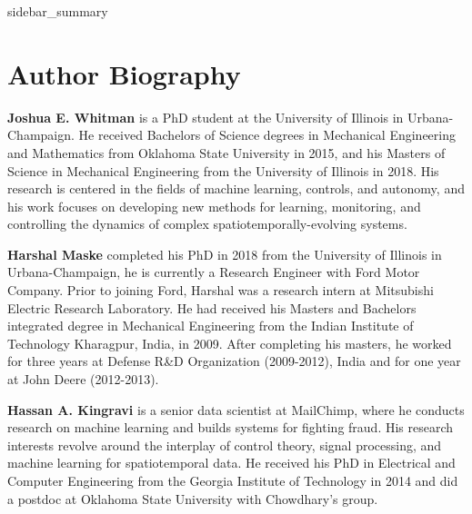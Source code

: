\documentclass[letterpaper,12pt,peerreviewca,draftcls]{IEEEtran}
\begin{document}
\processdelayedfloats
\sidebars


\renewcommand{\thealgorithm}{S\arabic{algorithm}} 
\setcounter{algorithm}{0}

\clearpage
 {sidebar_summary}

\clearpage


\clearpage


\clearpage





\newpage
\section{Author Biography}

\noindent \textbf{Joshua E. Whitman} is a PhD student at the University of Illinois in Urbana-Champaign. He received Bachelors of Science degrees in Mechanical Engineering and Mathematics from Oklahoma State University in 2015, and his Masters of Science in Mechanical Engineering from the University of Illinois in 2018. His research is centered in the fields of machine learning, controls, and autonomy, and his work focuses on developing new methods for learning, monitoring, and controlling the dynamics of complex spatiotemporally-evolving systems.

\noindent \textbf{Harshal Maske} completed his PhD in 2018 from the University of Illinois in Urbana-Champaign, he is currently a Research Engineer with Ford Motor Company. Prior to joining Ford, Harshal was a research intern at Mitsubishi Electric Research Laboratory. He had received his Masters and Bachelors integrated degree in Mechanical Engineering from the Indian Institute of Technology Kharagpur, India, in 2009. After completing his masters, he worked for three years at Defense R\&D Organization (2009-2012), India and for one year at John Deere (2012-2013). 

\noindent \textbf{Hassan A. Kingravi}  is a senior data scientist at MailChimp, where he conducts research on machine learning and builds systems for fighting fraud. His research interests revolve around the interplay of control theory, signal processing, and machine learning for spatiotemporal data. He received his PhD in Electrical and Computer Engineering from the Georgia Institute of Technology in 2014 and did a postdoc at Oklahoma State University with Chowdhary's group.
\end{document}
